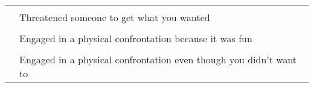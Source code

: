 \documentclass[utf8]{article}
\begin{document}
\begin{table}[]
{\begin{tabular}{ll}
                                                                                                                                                                                                                                                 &                                                                                                                                                                                                       \\
                                                                                                                                                                                                                                                 & Threatened someone to get what you wanted                                                                                                                                                             \\
                                                                                                                                                                                                                                                 &                                                                                                                                                                                                       \\
                                                                                                                                                                                                                                                 & Engaged in a physical confrontation because it was fun                                                                                                                                                \\
                                                                                                                                                                                                                                                 &                                                                                                                                                                                                       \\
                                                                                                                                                                                                                                                 & Engaged in a physical confrontation even though you didn't want to                                                                                                                                    \\

\end{tabular}}
\end{table}
\end{document}
